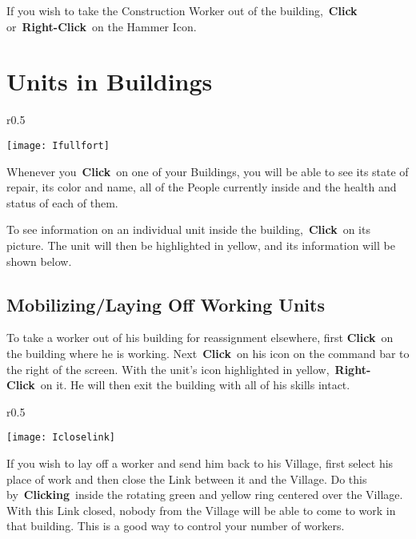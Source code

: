 If you wish to take the Construction Worker out of the building, \textbf{Click} or \textbf{Right-Click} on the Hammer Icon.

\section{Units in Buildings}


\begin{wrapfigure}{r}{0.5\textwidth}
	\vspace{-20pt}
	\begin{center}
		\texttt{[image: Ifullfort]}
	\end{center}
	\vspace{-20pt}
\end{wrapfigure}

Whenever you \textbf{Click} on one of your Buildings, you will be able to see its state of repair, its color and name, all of the People currently inside and the health and status of each of them.

To see information on an individual unit inside the building, \textbf{Click} on its picture. The unit will then be highlighted in yellow, and its information will be shown below.

\subsection{Mobilizing/Laying Off Working Units}

To take a worker out of his building for reassignment elsewhere, first \textbf{Click} on the building where he is working. Next \textbf{Click} on his icon on the command bar to the right of the screen. With the unit’s icon highlighted in yellow, \textbf{Right-Click} on it. He will then exit the building with all of his skills intact.

\begin{wrapfigure}{r}{0.5\textwidth}
	\vspace{-20pt}
	\begin{center}
		\texttt{[image: Icloselink]}
	\end{center}
	\vspace{-20pt}
\end{wrapfigure}

If you wish to lay off a worker and send him back to his Village, first select his place of work and then close the Link between it and the Village. Do this by \textbf{Clicking} inside the rotating green and yellow ring centered over the Village. With this Link closed, nobody from the Village will be able to come to work in that building. This is a good way to control your number of workers.

